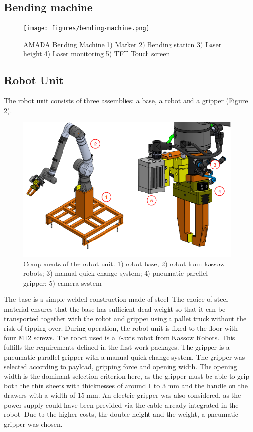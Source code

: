 
\subsection{Bending machine}
\begin{figure}[h]
    \centering
    \texttt{[image: figures/bending-machine.png]}
    \caption{\hyperref[acro:AMADA]{AMADA} Bending Machine 1) Marker 2) Bending station 3) Laser height 4) Laser monitoring 5) \hyperref[acro:TFT]{TFT} Touch screen}
    \label{fig:bending_machine}
\end{figure}

\subsection{Robot Unit}

The robot unit consists of three assemblies: a base, a robot and a gripper (Figure \ref{fig:kr1410}).

\begin{figure}[h]
    \centering
    \includegraphics[width=\textwidth]{4. Hardware Integration/4.1 Installation and Configuration/kr1410.png}
    \caption{Components of the robot unit: 1) robot base; 2) robot from kassow robots; 3) manual quick-change system; 4) pneumatic parellel gripper; 5) camera system}
    \label{fig:kr1410}
\end{figure}

The base is a simple welded construction made of steel. The choice of steel material ensures that the base has
sufficient dead weight so that it can be transported together with the robot and gripper using a pallet
truck without the risk of tipping over. During operation, the robot unit is fixed to the floor with four M12
screws. The robot used is a 7-axis robot from Kassow Robots. This fulfills the requirements defined in
the first work packages. The gripper is a pneumatic parallel gripper with a manual quick-change
system. The gripper was selected according to payload, gripping force and opening width. The
opening width is the dominant selection criterion here, as the gripper must be able to grip both the thin
sheets with thicknesses of around 1 to 3 mm and the handle on the drawers with a width of 15 mm. An
electric gripper was also considered, as the power supply could have been provided via the cable
already integrated in the robot. Due to the higher costs, the double height and the weight, a pneumatic
gripper was chosen.




